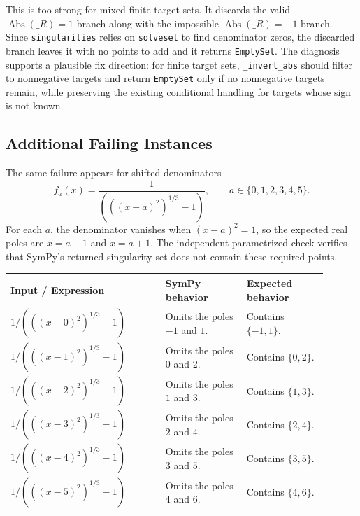 \documentclass[11pt]{article}
\begin{document}
\noindent
This is too strong for mixed finite target sets. It discards the valid
\(\operatorname{Abs}(\_R)=1\) branch along with the impossible
\(\operatorname{Abs}(\_R)=-1\) branch. Since \texttt{singularities} relies on
\texttt{solveset} to find denominator zeros, the discarded branch leaves it with
no points to add and it returns \texttt{EmptySet}. The diagnosis supports a
plausible fix direction: for finite target sets, \texttt{\_invert\_abs} should
filter to nonnegative targets and return \texttt{EmptySet} only if no
nonnegative targets remain, while preserving the existing conditional handling
for targets whose sign is not known.

\subsection{Additional Failing Instances}

The same failure appears for shifted denominators
\[
    f_a(x)=
    \frac{1}{(((x-a)^2)^{1/3}-1)},\qquad a\in\{0,1,2,3,4,5\}.
\]
For each \(a\), the denominator vanishes when \((x-a)^2=1\), so the expected
real poles are \(x=a-1\) and \(x=a+1\). The independent parametrized check
verifies that SymPy's returned singularity set does not contain these required
points.

\begin{center}
\small
\renewcommand{\arraystretch}{1.3}
\begin{tabular}{@{}>{\raggedright\arraybackslash}p{0.44\linewidth}>{\raggedright\arraybackslash}p{0.23\linewidth}>{\raggedright\arraybackslash}p{0.23\linewidth}@{}}
\toprule
\textbf{Input / Expression} & \textbf{SymPy behavior} & \textbf{Expected behavior} \\
\midrule
\(1/(((x-0)^2)^{1/3}-1)\) & Omits the poles \(-1\) and \(1\). & Contains \(\{-1,1\}\). \\
\(1/(((x-1)^2)^{1/3}-1)\) & Omits the poles \(0\) and \(2\). & Contains \(\{0,2\}\). \\
\(1/(((x-2)^2)^{1/3}-1)\) & Omits the poles \(1\) and \(3\). & Contains \(\{1,3\}\). \\
\(1/(((x-3)^2)^{1/3}-1)\) & Omits the poles \(2\) and \(4\). & Contains \(\{2,4\}\). \\
\(1/(((x-4)^2)^{1/3}-1)\) & Omits the poles \(3\) and \(5\). & Contains \(\{3,5\}\). \\
\(1/(((x-5)^2)^{1/3}-1)\) & Omits the poles \(4\) and \(6\). & Contains \(\{4,6\}\). \\
\bottomrule
\end{tabular}
\end{center}
\end{document}
